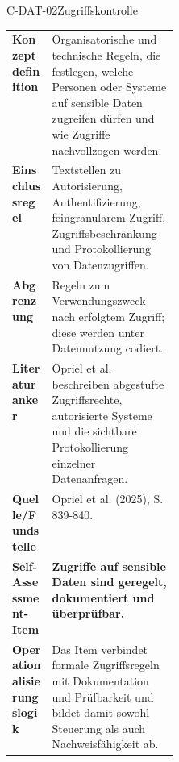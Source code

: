 \documentclass[10pt,a4paper]{article}
\begin{document}
\begin{codecard}{C-DAT-02}{Zugriffskontrolle}
\begin{tabularx}{\linewidth}{@{}>{\RaggedRight\arraybackslash\bfseries\color{DeepNavy}}p{0.245\linewidth}>{\RaggedRight\arraybackslash}X@{}}
Konzeptdefinition & Organisatorische und technische Regeln, die festlegen, welche Personen oder Systeme auf sensible Daten zugreifen dürfen und wie Zugriffe nachvollzogen werden. \\
\arrayrulecolor{SoftRule}\hline
Einschlussregel & Textstellen zu Autorisierung, Authentifizierung, feingranularem Zugriff, Zugriffsbeschränkung und Protokollierung von Datenzugriffen. \\
\arrayrulecolor{SoftRule}\hline
Abgrenzung & Regeln zum Verwendungszweck nach erfolgtem Zugriff; diese werden unter Datennutzung codiert. \\
\arrayrulecolor{SoftRule}\hline
Literaturanker & Opriel et al. beschreiben abgestufte Zugriffsrechte, autorisierte Systeme und die sichtbare Protokollierung einzelner Datenanfragen. \\
\arrayrulecolor{SoftRule}\hline
Quelle/Fundstelle & Opriel et al. (2025), S. 839-840. \\
\arrayrulecolor{SoftRule}\hline
Self-Assessment-Item & \textbf{Zugriffe auf sensible Daten sind geregelt, dokumentiert und überprüfbar.} \\
\arrayrulecolor{SoftRule}\hline
Operationalisierungslogik & Das Item verbindet formale Zugriffsregeln mit Dokumentation und Prüfbarkeit und bildet damit sowohl Steuerung als auch Nachweisfähigkeit ab. \\
\end{tabularx}
\end{codecard}
\end{document}
